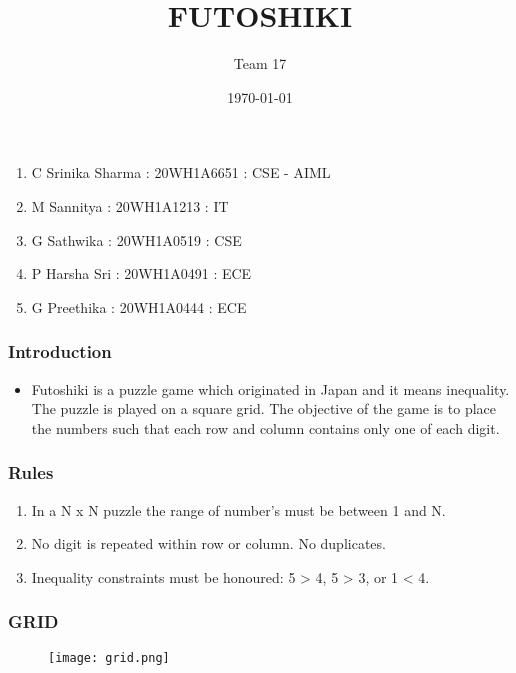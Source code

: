 \documentclass[14pt]{beamer}
\title{FUTOSHIKI}
\subtitle{Team 17}
\date{\today}
\begin{document}
  
  \begin{frame}
        \titlepage
    \end{frame}
  \begin{frame}
	\begin{enumerate}
		\item C Srinika Sharma : 20WH1A6651 : CSE - AIML
		\item M Sannitya : 20WH1A1213 : IT 
		\item G Sathwika : 20WH1A0519 : CSE
		\item P Harsha Sri : 20WH1A0491 : ECE
		\item G Preethika : 20WH1A0444 : ECE
	\end{enumerate}
  \end{frame}


  \begin{frame}
	\frametitle{Introduction}
        
	\begin{itemize}
	    \item Futoshiki is a puzzle game which originated in Japan and it means inequality. The puzzle is played on a square grid. The objective of the game is to place the numbers such that each row and column contains only one of each digit.
	\end{itemize}
	
  \end{frame}
   \begin{frame}
	\frametitle{Rules}

	\begin{enumerate}
	    \item In a N x N puzzle the range of number's must be between 1 and N.  
	    \item No digit is repeated within row or column. No duplicates. 
	    \item Inequality constraints must be honoured: 5 > 4, 5 > 3, or 1 < 4.
	\end{enumerate}
  \end{frame}
 
 \begin{frame}
 \frametitle{GRID}
 \begin{figure}
 \texttt{[image: grid.png]}
 \end{figure}
 \end{frame}
   
\end{document}
